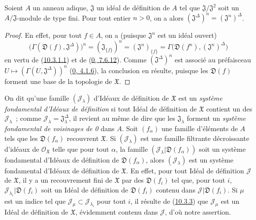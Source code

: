 \begin{proposition}[10.3.6]
\label{I.10.3.6-fr}
Soient $A$ un anneau adique, $\mathfrak{J}$ un idéal de définition de $A$
tel que $\mathfrak{J}/\mathfrak{J}^2$ soit un
$A/\mathfrak{J}$-module de type fini. Pour tout entier $n>0$, on a alors
$(\mathfrak{J}^\Delta)^n=(\mathfrak{J}^n)^\Delta$.
\end{proposition}

\begin{proof}
En effet, pour tout $f\in A$, on a (puisque $\mathfrak{J}^n$ est un idéal
ouvert)
\[
  \bigl(\Gamma(\mathfrak{D}(f),\mathfrak{J}^\Delta)\bigr)^n
  =(\mathfrak{J}_{\{f\}})^n
  =(\mathfrak{J}^n)_{\{f\}}
  =\Gamma\bigl(\mathfrak{D}(f^n),(\mathfrak{J}^n)^\Delta\bigr)
\]
en vertu de (\hyperref[I.10.3.1.1-fr]{10.3.1.1}) et de
(\hyperref[0.7.6.12-fr]{0, 7.6.12}). Comme
$(\mathfrak{J}^\Delta)^n$ est associé au préfaisceau
$U\mapsto(\Gamma(U,\mathfrak{J}^\Delta))^n$
(\hyperref[0.4.1.6-fr]{0, 4.1.6}), la conclusion en résulte, puisque les
$\mathfrak{D}(f)$ forment une base de la topologie de $\mathfrak{X}$.
\end{proof}

\begin{env}[10.3.7]
\label{I.10.3.7-fr}
On dit qu'une famille $(\mathscr{J}_\lambda)$ d'Idéaux de définition de
$\mathfrak{X}$ est un \emph{système fondamental d'Idéaux de définition}
si tout Idéal de définition de $\mathfrak{X}$ contient un des
$\mathscr{J}_\lambda$~; comme
$\mathscr{J}_\lambda=\mathfrak{J}_\lambda^\Delta$, il revient au même de
dire que les $\mathfrak{J}_\lambda$ forment un \emph{système fondamental
de voisinages de 0} dans $A$. Soit $(f_\alpha)$ une famille d'éléments de
$A$ tels que les $\mathfrak{D}(f_\alpha)$ recouvrent $\mathfrak{X}$. Si
$(\mathscr{J}_\lambda)$ est une famille filtrante décroissante d'idéaux de
$\mathscr{O}_{\mathfrak{X}}$ telle que pour tout $\alpha$, la famille
$(\mathscr{J}_\lambda|\mathfrak{D}(f_\alpha))$ soit un système fondamental
d'Idéaux de définition de $\mathfrak{D}(f_\alpha)$, alors
$(\mathscr{J}_\lambda)$ est un système fondamental d'Idéaux de définition
de $\mathfrak{X}$. En effet, pour tout Idéal de définition $\mathscr{J}$
de $\mathfrak{X}$, il y a un recouvrement fini de $\mathfrak{X}$ par des
$\mathfrak{D}(f_i)$ tel que, pour tout $i$,
$\mathscr{J}_{\lambda_i}|\mathfrak{D}(f_i)$ soit un Idéal de définition
de $\mathfrak{D}(f_i)$ contenu dans
$\mathscr{J}|\mathfrak{D}(f_i)$. Si $\mu$ est un indice tel que
$\mathscr{J}_\mu\subset\mathscr{J}_{\lambda_i}$ pour tout $i$, il résulte
de (\hyperref[I.10.3.3-fr]{10.3.3}) que $\mathscr{J}_\mu$ est un Idéal de
définition de $\mathfrak{X}$, évidemment contenu dans $\mathscr{J}$, d'où
notre assertion.
\end{env}

